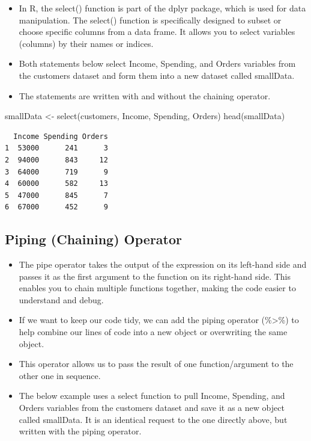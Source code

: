 \documentclass[
  letterpaper,
  DIV=11,
  numbers=noendperiod]{scrreprt}
\newenvironment{Shaded}{\begin{snugshade}}{\end{snugshade}}
\newcommand{\FunctionTok}[1]{\textcolor[rgb]{0.28,0.35,0.67}{#1}}
\newcommand{\NormalTok}[1]{\textcolor[rgb]{0.00,0.23,0.31}{#1}}
\newcommand{\OtherTok}[1]{\textcolor[rgb]{0.00,0.23,0.31}{#1}}
\providecommand{\tightlist}{%
  \setlength{\itemsep}{0pt}\setlength{\parskip}{0pt}}\usepackage{longtable,booktabs,array}
\begin{document}
\begin{itemize}
\tightlist
\item
  In R, the select() function is part of the dplyr package, which is
  used for data manipulation. The select() function is specifically
  designed to subset or choose specific columns from a data frame. It
  allows you to select variables (columns) by their names or indices.
\item
  Both statements below select Income, Spending, and Orders variables
  from the customers dataset and form them into a new dataset called
  smallData.
\item
  The statements are written with and without the chaining operator.
\end{itemize}

\begin{Shaded}
\begin{Highlighting}[]
\NormalTok{smallData }\OtherTok{\textless{}{-}} \FunctionTok{select}\NormalTok{(customers, Income, Spending, Orders)}
\FunctionTok{head}\NormalTok{(smallData)}
\end{Highlighting}
\end{Shaded}

\begin{verbatim}
  Income Spending Orders
1  53000      241      3
2  94000      843     12
3  64000      719      9
4  60000      582     13
5  47000      845      7
6  67000      452      9
\end{verbatim}

\subsection{Piping (Chaining) Operator}\label{piping-chaining-operator}

\begin{itemize}
\tightlist
\item
  The pipe operator takes the output of the expression on its left-hand
  side and passes it as the first argument to the function on its
  right-hand side. This enables you to chain multiple functions
  together, making the code easier to understand and debug.
\item
  If we want to keep our code tidy, we can add the piping operator
  (\%\textgreater\%) to help combine our lines of code into a new object
  or overwriting the same object.
\item
  This operator allows us to pass the result of one function/argument to
  the other one in sequence.
\item
  The below example uses a select function to pull Income, Spending, and
  Orders variables from the customers dataset and save it as a new
  object called smallData. It is an identical request to the one
  directly above, but written with the piping operator.
\end{itemize}
\end{document}
